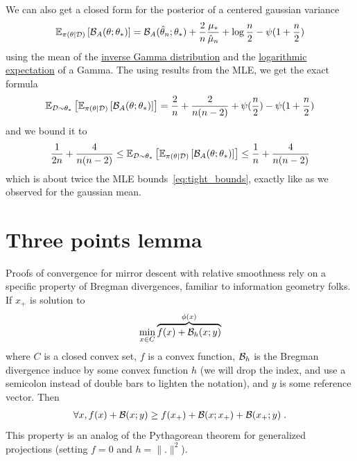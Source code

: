 \documentclass{article}
\newenvironment{example}{
	\begin{mdframed}[backgroundcolor=light-gray, roundcorner=5pt]
}{		
	\end{mdframed}
}
\newcommand*{\expect}[2][]{\ensuremath{\mathbb{E}_{#1} \left[ #2 \right] }} %
\newcommand{\logpart}{A}
\newcommand{\bregman}{\cB_\logpart}
\newcommand{\natp}{\theta}
\begin{document}
\begin{example}
	We can also get a closed form for the posterior of a centered gaussian variance 
	\begin{align}
		\expect[\pi(\natp|\cD)]{\bregman(\natp ; \natp_*)} = \bregman(\hat \natp_n ; \natp_*) + \frac{2}{n} \frac{\mu_*}{\hat \mu_n} + \log\frac{n}{2} - \psi(1 + \frac{n}{2})
	\end{align}
	using the mean of the \href{https://en.wikipedia.org/wiki/Inverse-gamma_distribution}{inverse Gamma distribution} and the \href{https://en.wikipedia.org/wiki/Gamma_distribution#Logarithmic_expectation_and_variance}{logarithmic expectation} of a Gamma. The using results from the MLE, we get the exact formula
	\begin{align}
		\expect[\cD\sim\natp_*]{\expect[\pi(\natp|\cD)]{\bregman(\natp ; \natp_*)}}
		= \frac{2}{n} + \frac{2}{n(n-2)} + \psi(\half[n]) - \psi(1+ \half[n])
	\end{align}
	and we bound it to 
	\begin{align}
		\inv{2n} + \frac{4}{n(n-2)}
		\leq \expect[\cD\sim\natp_*]{\expect[\pi(\natp|\cD)]{\bregman(\natp ; \natp_*)}}
		\leq 
		\inv{n} + \frac{4}{n(n-2)}
	\end{align}
	which is about twice the MLE bounds~\eqref{eq:tight_bounds}, exactly like as we observed for the gaussian mean.
\end{example}


\section{Three points lemma}
\label{app:3points}

Proofs of convergence for mirror descent with relative smoothness rely on a specific property of Bregman divergences, familiar to information geometry folks. If $x_+$ is solution to 
\begin{align}
	\min	_{x\in C} \overbrace{f(x) + {\mathcal B}_h(x ; y)}^{\phi(x)}
\end{align}
where $C$ is a closed convex set, $f$ is a convex function, ${\mathcal B}_h$ is the Bregman divergence induce by some convex function $h$ (we will drop the index, and use a semicolon instead of double bars to lighten the notation), and $y$ is some reference vector. Then 
\begin{align}
	\forall x, f(x) + {\mathcal B}(x ;y) \geq f(x_+) + {\mathcal B}(x ; x_+) +{\mathcal B}(x_+ ; y) \; .
\end{align}
This property is an analog of the Pythagorean theorem for generalized projections (setting $f=0$ and $h=\|.\|^2$).
\end{document}

